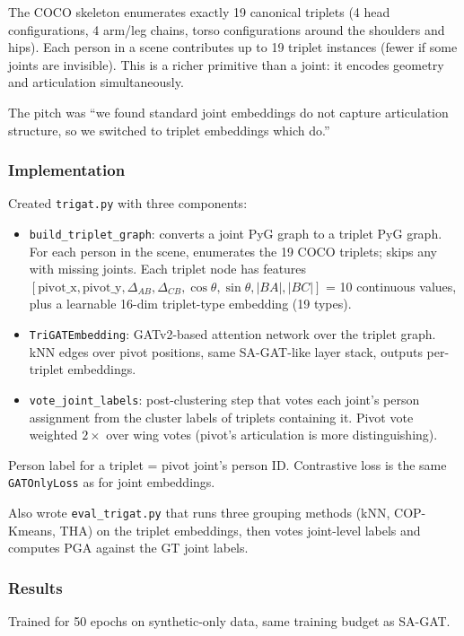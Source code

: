 The COCO skeleton enumerates exactly 19 canonical triplets (4 head configurations, 4 arm/leg chains, torso configurations around the shoulders and hips). Each person in a scene contributes up to 19 triplet instances (fewer if some joints are invisible). This is a richer primitive than a joint: it encodes geometry and articulation simultaneously.

The pitch was ``we found standard joint embeddings do not capture articulation structure, so we switched to triplet embeddings which do.''

\subsubsection{Implementation}

Created \texttt{trigat.py} with three components:
\begin{itemize}
    \item \texttt{build\_triplet\_graph}: converts a joint PyG graph to a triplet PyG graph. For each person in the scene, enumerates the 19 COCO triplets; skips any with missing joints. Each triplet node has features $[\text{pivot\_x}, \text{pivot\_y}, \Delta_{AB}, \Delta_{CB}, \cos\theta, \sin\theta, |BA|, |BC|]$ = 10 continuous values, plus a learnable 16-dim triplet-type embedding (19 types).
    \item \texttt{TriGATEmbedding}: GATv2-based attention network over the triplet graph. kNN edges over pivot positions, same SA-GAT-like layer stack, outputs per-triplet embeddings.
    \item \texttt{vote\_joint\_labels}: post-clustering step that votes each joint's person assignment from the cluster labels of triplets containing it. Pivot vote weighted $2\times$ over wing votes (pivot's articulation is more distinguishing).
\end{itemize}

Person label for a triplet = pivot joint's person ID. Contrastive loss is the same \texttt{GATOnlyLoss} as for joint embeddings.

Also wrote \texttt{eval\_trigat.py} that runs three grouping methods (kNN, COP-Kmeans, THA) on the triplet embeddings, then votes joint-level labels and computes PGA against the GT joint labels.

\subsubsection{Results}

Trained for 50 epochs on synthetic-only data, same training budget as SA-GAT.

